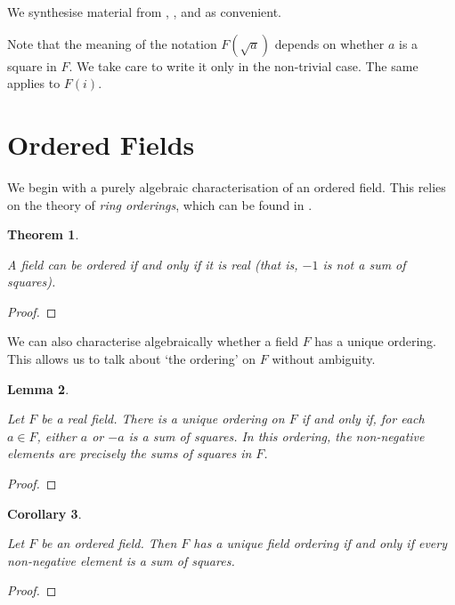 \documentclass{article}
\newtheorem{theorem}{Theorem}[section]
\newtheorem{lemma}[theorem]{Lemma}
\newtheorem{corollary}[theorem]{Corollary}
\newcommand{\leanok}{}
\newcommand{\lean}[1]{}
\newcommand{\uses}[1]{}
\begin{document}
We synthesise material from \cite{Bochnak1998}, \cite{Knebusch2022}, \cite{Jacobson2012I} and \cite{Jacobson2012II} as convenient.

Note that the meaning of the notation $F(\sqrt{a})$ depends on whether $a$ is a square in $F$. We take care to write it only in the non-trivial case. The same applies to $F(i)$.

\section{Ordered Fields}

We begin with a purely algebraic characterisation of an ordered field. This relies on the theory of \textit{ring orderings}, which can be found in \cite{Lam1984}.

\begin{theorem}
  \label{thm:ord_iff_real}
  \lean{Field.exists_isStrictOrderedRing_iff_isSemireal}
  \leanok
  A field can be ordered if and only if it is real (that is, $-1$ is not a sum of squares).
\end{theorem}
\begin{proof}
  \leanok
\end{proof}

We can also characterise algebraically whether a field $F$ has a unique ordering. This allows us to talk about `the ordering' on $F$ without ambiguity.

\begin{lemma}
  \label{lem:unique_ord_cond}
  \lean{IsSemireal.existsUnique_isStrictOrderedRing_iff, IsSemireal.unique_isStrictOrderedRing}
  \leanok
  Let $F$ be a real field. There is a unique ordering on $F$ if and only if, for each $a\in F$, either $a$ or $-a$ is a sum of squares. In this ordering, the non-negative elements are precisely the sums of squares in $F$.
\end{lemma}
\begin{proof}
  \leanok
\end{proof}

\begin{corollary}
  \label{cor:unique_ord_cond_ordered}
  \lean{IsStrictOrderedRing.unique_isStrictOrderedRing_iff}
  \leanok
  Let $F$ be an ordered field. Then $F$ has a unique field ordering if and only if every non-negative element is a sum of squares.
\end{corollary}
\begin{proof}
  \uses{lem:unique_ord_cond}
  \leanok
\end{proof}
\end{document}
